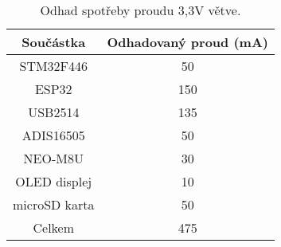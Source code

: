 \begin{table}[h!]
\centering

\begin{tabular}{|c|c|}
\hline 
Součástka & Odhadovaný proud (mA) \\ 
\hline 
\hline 
STM32F446 & 50 \\ 
\hline 
ESP32 & 150 \\ 
\hline 
USB2514 & 135 \\ 
\hline 
ADIS16505 & 50 \\ 
\hline 
NEO-M8U & 30 \\ 
\hline 
OLED displej & 10 \\ 
\hline 
microSD karta & 50 \\ 
\hline 
\hline 
Celkem & 475 \\ 
\hline 
\end{tabular} 

\caption{Odhad spotřeby proudu 3,3V větve.} 
\label{table:currentConsumption}
\end{table} 